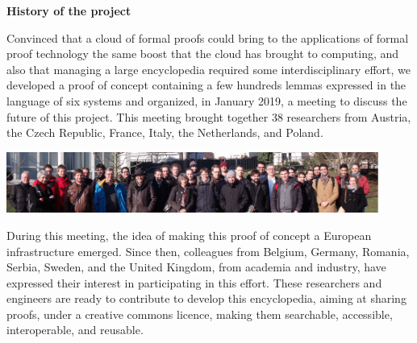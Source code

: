 \begin{shaded}
  \vspace*{-0.5cm}
  \begin{center}
    {\bf \Large History of the project}
  \end{center}

Convinced that a cloud of formal proofs could bring to the
applications of formal proof technology the same boost that the cloud
has brought to computing, and also that managing a large encyclopedia
required some interdisciplinary effort,
we developed a proof of concept containing a few hundreds lemmas
expressed in the language of six systems and organized, in January 2019,
a meeting to discuss the future of this project.
This
meeting brought together 38 researchers from Austria, the Czech
Republic, France, Italy, the Netherlands, and Poland.
\begin{center}
\includegraphics[height=2cm]{img/Photo-reduced.png}
\end{center}
During this meeting, the idea of making this proof of concept a
European infrastructure emerged.  Since then, colleagues from Belgium,
Germany, Romania, Serbia, Sweden, and the United Kingdom, from
academia and industry, have expressed their interest in participating
in this effort.  These researchers and engineers are ready to
contribute to develop this encyclopedia, aiming at sharing proofs,
under a creative commons licence, making them searchable, accessible,
interoperable, and reusable.
\end{shaded}


